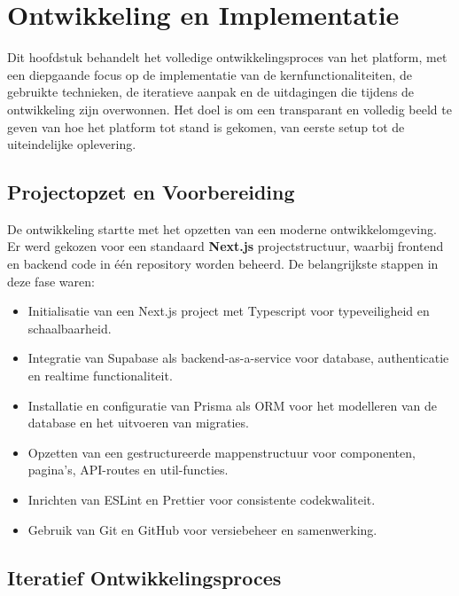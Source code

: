 \chapter{Ontwikkeling en Implementatie}
\label{ch:ontwikkeling}

Dit hoofdstuk behandelt het volledige ontwikkelingsproces van het platform, met een diepgaande focus op de implementatie van de kernfunctionaliteiten, de gebruikte technieken, de iteratieve aanpak en de uitdagingen die tijdens de ontwikkeling zijn overwonnen. Het doel is om een transparant en volledig beeld te geven van hoe het platform tot stand is gekomen, van eerste setup tot de uiteindelijke oplevering.

\section{Projectopzet en Voorbereiding}
\label{sec:projectopzet}

De ontwikkeling startte met het opzetten van een moderne ontwikkelomgeving. Er werd gekozen voor een standaard \textbf{Next.js} projectstructuur, waarbij frontend en backend code in één repository worden beheerd. De belangrijkste stappen in deze fase waren:
\begin{itemize}
    \item Initialisatie van een Next.js project met Typescript voor typeveiligheid en schaalbaarheid.
    \item Integratie van Supabase als backend-as-a-service voor database, authenticatie en realtime functionaliteit.
    \item Installatie en configuratie van Prisma als ORM voor het modelleren van de database en het uitvoeren van migraties.
    \item Opzetten van een gestructureerde mappenstructuur voor componenten, pagina's, API-routes en util-functies.
    \item Inrichten van ESLint en Prettier voor consistente codekwaliteit.
    \item Gebruik van Git en GitHub voor versiebeheer en samenwerking.
\end{itemize}

\section{Iteratief Ontwikkelingsproces}
\label{sec:iteratief-proces}

